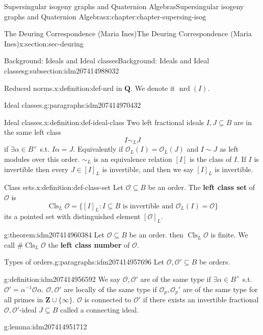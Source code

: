\documentclass[oneside,10pt,]{book}
\newcommand{\terminology}[1]{\textbf{#1}}
\numberwithin{equation}{section}
\newcommand{\inv}{^{-1}}
\newcommand{\lb}{[}
\newcommand{\rb}{]}
\newcommand{\ZZ}{\mathbf{Z}}
\newcommand{\QQ}{\mathbf{Q}}
\newcommand{\ints}{\mathcal{O}}
\begin{document}
\begin{chapterptx}{Supersingular isogeny graphs and Quaternion Algebras}{}{Supersingular isogeny graphs and Quaternion Algebras}{}{}{x:chapter:chapter-supersing-isog}
\begin{sectionptx}{The Deuring Correspondence (Maria Ines)}{}{The Deuring Correspondence (Maria Ines)}{}{}{x:section:sec-deuring}
\begin{subsectionptx}{Background: Ideals and Ideal classes}{}{Background: Ideals and Ideal classes}{}{}{g:subsection:idm207414988032}
\begin{definition}{Reduced norms.}{x:definition:def-nrd}
in \(\QQ\). We denote it \(\operatorname{nrd}(I)\).%
\end{definition}
\begin{paragraphs}{Ideal classes.}{g:paragraphs:idm207414970432}%
\begin{definition}{Ideal classes.}{x:definition:def-ideal-class}%
Two left fractional ideals \(I,J \subseteq B\) are in the same left class%
\begin{equation*}
I\sim_L J
\end{equation*}
if \(\exists  \alpha \in B^\times\) s.t. \(I\alpha = J\). Equivalently if \(\ints_L(I)  = \ints_L(J)\) and \(I \sim J\) as left modules over this order. \(\sim_L\) is an equivalence relation \(\lb I \rb\) is the class of \(I\). If \(I \) is invertible then every \(J \in \lb I \rb_L\) is invertible, and then we say \(\lb I \rb_L \) is invertible.%
\end{definition}
\begin{definition}{Class sets.}{x:definition:def-class-set}%
Let \(\ints \subseteq B\) be an order. The \terminology{left class set} of \(\ints\) is%
\begin{equation*}
\operatorname{Cls}_L \ints   = \{ \lb I \rb_L : I \subseteq B \text{ is invertible  and } \ints_L(I) = \ints\}
\end{equation*}
its a pointed set with distinguished element \(\lb \ints \rb_L\).%
\end{definition}
\begin{theorem}{}{}{g:theorem:idm207414960384}%
Let \(\ints \subseteq B\) be an order. then \(\operatorname{Cls} _L \ints\) is finite. We call \(\# \operatorname{Cls}_L\ints \) the \terminology{left class number} of \(\ints\).%
\end{theorem}
\end{paragraphs}%
\begin{paragraphs}{Types of orders.}{g:paragraphs:idm207414957696}%
Let \(\ints ,\ints'  \subseteq B\) be orders.%
\begin{definition}{}{g:definition:idm207414956592}%
We say \(\ints,\ints' \) are of the same type if \(\exists \alpha \in B^\times\) s.t. \(\ints ' = \alpha \inv \ints \alpha\). \(\ints,\ints'\) are locally of the same type if \(\ints_p, \ints_p'\) are of the same type for all primes in \(\ZZ\cup\{\infty\}\). \(\ints\) is connected to  \(\ints'\) if there exists an invertible fractional \(\ints,\ints'\)-ideal \(J \subseteq B\) called a connecting ideal.%
\end{definition}
\begin{lemma}{}{}{g:lemma:idm207414951712}%

\end{lemma}
\end{paragraphs}
\end{subsectionptx}
\end{sectionptx}
\end{chapterptx}
\end{document}
